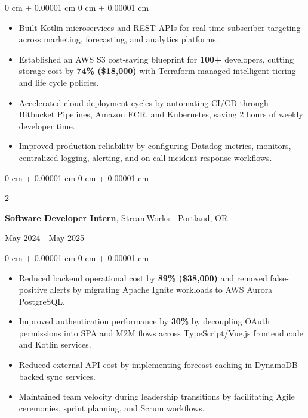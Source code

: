 \documentclass[10pt, letterpaper]{article}
\newenvironment{onecolentry}{
    \begin{adjustwidth}{
        0 cm + 0.00001 cm
    }{
        0 cm + 0.00001 cm
    }
}{
    \end{adjustwidth}
}
\newenvironment{twocolentry}[2][]{
    \onecolentry
    \def\secondColumn{#2}
    \setcolumnwidth{\fill, 6 cm}
    \begin{paracol}{2}
}{
    \switchcolumn \raggedleft \secondColumn
    \end{paracol}
    \endonecolentry
}
\begin{document}
    \vspace{0.10 cm}
    \begin{onecolentry}
        \begin{itemize}[leftmargin=2em, itemsep=1pt, parsep=0pt, topsep=0pt, partopsep=0pt]
            \item Built Kotlin microservices and REST APIs for real-time subscriber targeting across marketing, forecasting, and analytics platforms.
            \item Established an AWS S3 cost-saving blueprint for \textbf{100+} developers, cutting storage cost by \textbf{74\% (\$18,000)} with Terraform-managed intelligent-tiering and life cycle policies.
            \item Accelerated cloud deployment cycles by automating CI/CD through Bitbucket Pipelines, Amazon ECR, and Kubernetes, saving 2 hours of weekly developer time.
            \item Improved production reliability by configuring Datadog metrics, monitors, centralized logging, alerting, and on-call incident response workflows.
        \end{itemize}
    \end{onecolentry}

    \vspace{0.10 cm}

    \begin{twocolentry}{May 2024 - May 2025}
        \textbf{Software Developer Intern}, StreamWorks - Portland, OR
    \end{twocolentry}

    \vspace{0.10 cm}
    \begin{onecolentry}
        \begin{itemize}[leftmargin=2em, itemsep=1pt, parsep=0pt, topsep=0pt, partopsep=0pt]
            \item Reduced backend operational cost by \textbf{89\% (\$38,000)} and removed false-positive alerts by migrating Apache Ignite workloads to AWS Aurora PostgreSQL.
            \item Improved authentication performance by \textbf{30\%} by decoupling OAuth permissions into SPA and M2M flows across TypeScript/Vue.js frontend code and Kotlin services.
            \item Reduced external API cost by implementing forecast caching in DynamoDB-backed sync services.
            \item Maintained team velocity during leadership transitions by facilitating Agile ceremonies, sprint planning, and Scrum workflows.
        \end{itemize}
    \end{onecolentry}
\end{document}
